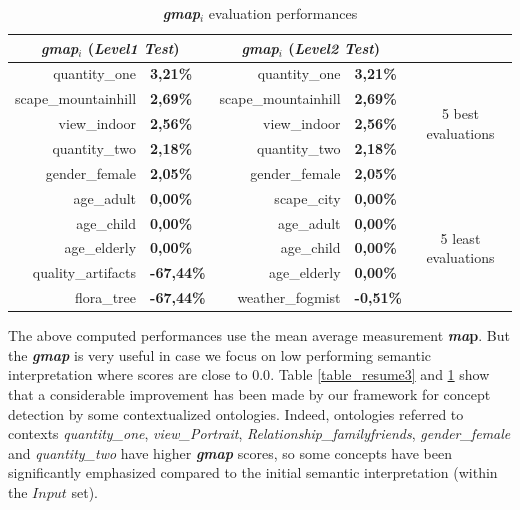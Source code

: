 		\begin{table}
	\centering	
	\caption{\textbf{\textit{gmap$_{i}$}} evaluation performances}
		\label{table_resume4}
		\begin{tabular}{rl rl c} 
			\hline
			
			\multicolumn{2}{c}{\textbf{\textit{gmap$_{i}$}} (\emph{Level1 Test})} & 
			\multicolumn{2}{c}{\textbf{\textit{gmap$_{i}$}} (\emph{Level2 Test})} & \\
			\hline  
	
			quantity\_one&\textbf{3,21\%}&quantity\_one&\textbf{3,21\%}& \multirow{5}{*}{5 best evaluations}\\
			scape\_mountainhill&\textbf{2,69\%}&scape\_mountainhill&\textbf{2,69\%}& \\
			view\_indoor&\textbf{2,56\%}&view\_indoor&\textbf{2,56\%}& \\
			quantity\_two&\textbf{2,18\%}&quantity\_two&\textbf{2,18\%}& \\
			gender\_female&\textbf{2,05\%}&gender\_female&\textbf{2,05\%}& \\
			\hline
			age\_adult&\textbf{0,00\%}&scape\_city&\textbf{0,00\%}& \multirow{5}{*}{5 least evaluations} \\
			age\_child&\textbf{0,00\%}&age\_adult&\textbf{0,00\%}& \\
			age\_elderly&\textbf{0,00\%}&age\_child&\textbf{0,00\%}& \\
			quality\_artifacts&\textbf{-67,44\%}&age\_elderly&\textbf{0,00\%}& \\
			flora\_tree&\textbf{-67,44\%}&weather\_fogmist&\textbf{-0,51\%}& \\
			\hline 
\end{tabular}
\end{table}

		The above computed performances use the mean average measurement \textbf{\textit{ma}p}. 
		But the \textbf{\textit{gmap}} is 
		very useful in case we focus on low performing semantic interpretation 
		where scores are close to $0.0$. Table \ref{table_resume3} and \ref{table_resume4} show that a considerable 
		improvement has been made by our framework for concept detection by some contextualized ontologies. 
		Indeed, ontologies referred to contexts \emph{quantity\_one}, \emph{view\_Portrait}, 
		\emph{Relationship\_familyfriends}, \emph{gender\_female} and \emph{quantity\_two} have higher 
		\textbf{\textit{gmap}} scores, so some concepts have been significantly  
		emphasized compared to the initial semantic interpretation (within the $Input$ set).

